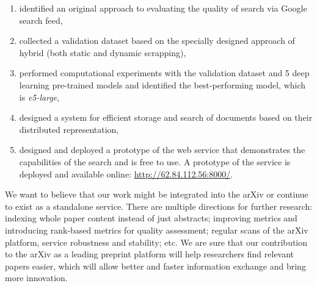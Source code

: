 \documentclass{article}
\begin{document}
\begin{enumerate}
            \item identified an original approach to evaluating the quality of search via Google search feed,
            \item collected a validation dataset based on the specially designed approach of hybrid (both static and dynamic scrapping),
            \item performed computational experiments with the validation dataset and 5 deep learning pre-trained models and identified the best-performing model, which is \textit{e5-large},
            \item designed a system for efficient storage and search of documents based on their distributed representation,
            \item designed and deployed a prototype of the web service that demonstrates the capabilities of the search and is free to use. A prototype of the service is deployed and available online: \url{http://62.84.112.56:8000/}.
        \end{enumerate}

        
        
        We want to believe that our work might be integrated into the arXiv or continue to exist as a standalone service. There are multiple directions for further research: indexing whole paper content instead of just abstracts; improving metrics and introducing rank-based metrics for quality assessment; regular scans of the arXiv platform, service robustness and stability; etc. We are sure that our contribution to the arXiv as a leading preprint platform will help researchers find relevant papers easier, which will allow better and faster information exchange and bring more innovation. 
    


\end{document}
